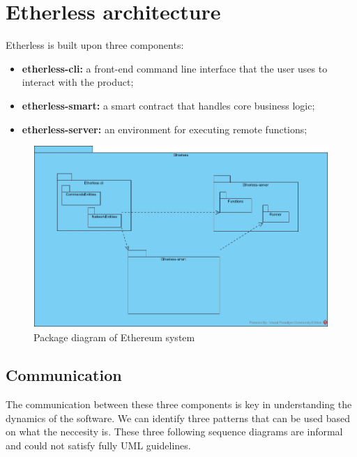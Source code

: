 \section{Etherless architecture}
Etherless is built upon three components:
\begin{itemize}
	\item \textbf{etherless-cli:} a front-end command line interface that the user uses to interact with the product;
	\item \textbf{etherless-smart:} a smart contract that handles core business logic;
	\item \textbf{etherless-server:} an environment for executing remote functions;
\end{itemize}
\begin{figure}[h]
	\centering
	\includegraphics[width=\textwidth]{res/img/packageDiagram.jpg}
	\caption{Package diagram of Ethereum system}
\end{figure}
\subsection{Communication}
The communication between these three components is key in understanding the dynamics of the software. We can identify three patterns that can be used based on what the neccesity is.
These three following sequence diagrams are informal and could not satisfy fully UML guidelines.
